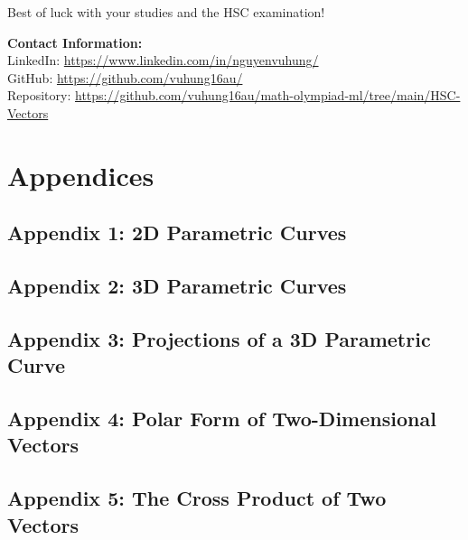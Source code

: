 \documentclass[12pt]{article}
\begin{document}
Best of luck with your studies and the HSC examination!

\vspace{2em}
\noindent\textbf{Contact Information:}\\[0.5em]
LinkedIn: \href{https://www.linkedin.com/in/nguyenvuhung/}{https://www.linkedin.com/in/nguyenvuhung/}\\[0.3em]
GitHub: \href{https://github.com/vuhung16au/}{https://github.com/vuhung16au/}\\[0.3em]
Repository: \href{https://github.com/vuhung16au/math-olympiad-ml/tree/main/HSC-Vectors}{https://github.com/vuhung16au/math-olympiad-ml/tree/main/HSC-Vectors}

\appendix
\section{Appendices}

\subsection{Appendix 1: 2D Parametric Curves}
\label{app:parametric-2d}


\newpage
\subsection{Appendix 2: 3D Parametric Curves}
\label{app:parametric-3d}


\newpage
\subsection{Appendix 3: Projections of a 3D Parametric Curve}
\label{app:projections}


\newpage


\newpage
\subsection{Appendix 4: Polar Form of Two-Dimensional Vectors}
\label{app:polar-form}


\newpage
\subsection{Appendix 5: The Cross Product of Two Vectors}
\label{app:cross-product}

\end{document}
